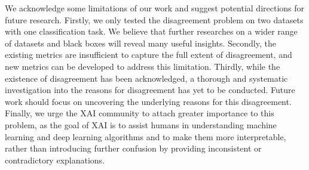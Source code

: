 We acknowledge some limitations of our work and suggest potential directions for future research. Firstly, we only tested the disagreement problem on two datasets with one classification task. We believe that further researches on a wider range of datasets and black boxes will reveal many useful insights. Secondly, the existing metrics are insufficient to capture the full extent of disagreement, and new metrics can be developed to address this limitation. Thirdly, while the existence of disagreement has been acknowledged, a thorough and systematic investigation into the reasons for disagreement has yet to be conducted. Future work should focus on uncovering the underlying reasons for this disagreement. Finally, we urge the XAI community to attach greater importance to this problem, as the goal of XAI is to assist humans in understanding machine learning and deep learning algorithms and to make them more interpretable, rather than introducing further confusion by providing inconsistent or contradictory explanations.


